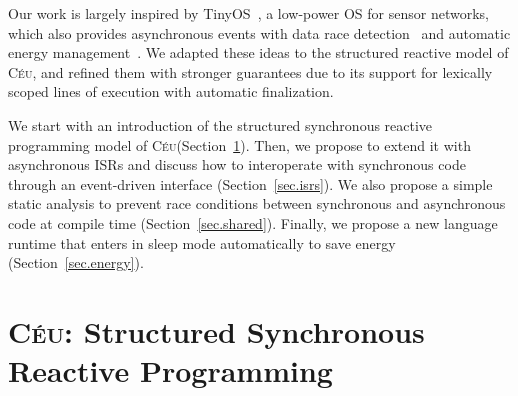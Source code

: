 \documentclass[sigplan,10pt,review,anonymous]{acmart}\settopmatter{printfolios=true,printccs=false,printacmref=false}
\newcommand{\CEU}{\textsc{C\'{e}u}\xspace}
\begin{document}
Our work is largely inspired by TinyOS~\cite{wsn.tos}, a low-power OS for
sensor networks, which also provides asynchronous events with %
data race detection~\cite{wsn.nesc} and automatic energy
management~\cite{wsn.icem}.
%
We adapted these ideas to the structured reactive model of \CEU,
and refined them with stronger guarantees due to its support for lexically
scoped lines of execution with automatic finalization.

We start with an introduction of the structured synchronous reactive
programming model of \CEU (Section~\ref{sec.ceu}).
Then, we propose to extend it with asynchronous ISRs and discuss how to
interoperate with synchronous code through an event-driven interface
(Section~\ref{sec.isrs}).
We also propose a simple static analysis to prevent race conditions between
synchronous and asynchronous code at compile time (Section~\ref{sec.shared}).
Finally, we propose a new language runtime that enters in sleep mode
automatically to save energy (Section~\ref{sec.energy}).

\section{\CEU: Structured Synchronous Reactive Programming}
\label{sec.ceu}
\end{document}
